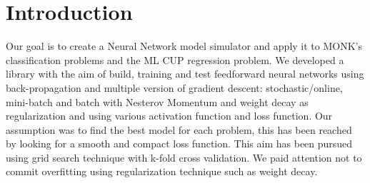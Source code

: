 \section{Introduction}
Our goal is to create a Neural Network model simulator and apply it to MONK's classification problems and the ML CUP regression problem. 
We developed a library with the aim of build, training and test feedforward neural networks using back-propagation and multiple version of gradient descent: stochastic/online, mini-batch and batch with Nesterov Momentum and weight decay as regularization and using various activation function and loss function. 
Our assumption was to find the best model for each problem, this has been reached by looking for a smooth  and compact loss function. This aim has been pursued using grid search technique with k-fold cross validation. We paid attention not to commit overfitting using regularization technique such as weight decay. 